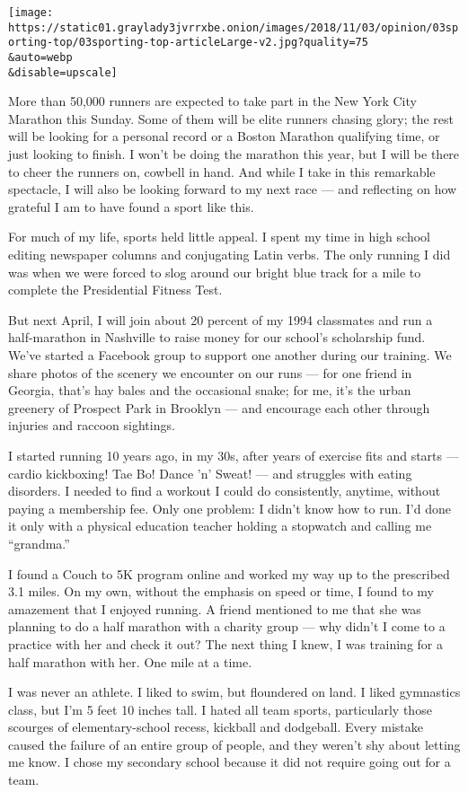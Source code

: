 \texttt{[image: https://static01.graylady3jvrrxbe.onion/images/2018/11/03/opinion/03sporting-top/03sporting-top-articleLarge-v2.jpg?quality=75\\\&auto=webp\\\&disable=upscale]}

More than 50,000 runners are expected to take part in the New York City
Marathon this Sunday. Some of them will be elite runners chasing glory;
the rest will be looking for a personal record or a Boston Marathon
qualifying time, or just looking to finish. I won't be doing the
marathon this year, but I will be there to cheer the runners on, cowbell
in hand. And while I take in this remarkable spectacle, I will also be
looking forward to my next race --- and reflecting on how grateful I am
to have found a sport like this.

For much of my life, sports held little appeal. I spent my time in high
school editing newspaper columns and conjugating Latin verbs. The only
running I did was when we were forced to slog around our bright blue
track for a mile to complete the Presidential Fitness Test.

But next April, I will join about 20 percent of my 1994 classmates and
run a half-marathon in Nashville to raise money for our school's
scholarship fund. We've started a Facebook group to support one another
during our training. We share photos of the scenery we encounter on our
runs --- for one friend in Georgia, that's hay bales and the occasional
snake; for me, it's the urban greenery of Prospect Park in Brooklyn ---
and encourage each other through injuries and raccoon sightings.

I started running 10 years ago, in my 30s, after years of exercise fits
and starts --- cardio kickboxing! Tae Bo! Dance 'n' Sweat! --- and
struggles with eating disorders. I needed to find a workout I could do
consistently, anytime, without paying a membership fee. Only one
problem: I didn't know how to run. I'd done it only with a physical
education teacher holding a stopwatch and calling me ``grandma.''

I found a Couch to 5K program online and worked my way up to the
prescribed 3.1 miles. On my own, without the emphasis on speed or time,
I found to my amazement that I enjoyed running. A friend mentioned to me
that she was planning to do a half marathon with a charity group --- why
didn't I come to a practice with her and check it out? The next thing I
knew, I was training for a half marathon with her. One mile at a time.

I was never an athlete. I liked to swim, but floundered on land. I liked
gymnastics class, but I'm 5 feet 10 inches tall. I hated all team
sports, particularly those scourges of elementary-school recess,
kickball and dodgeball. Every mistake caused the failure of an entire
group of people, and they weren't shy about letting me know. I chose my
secondary school because it did not require going out for a team.

